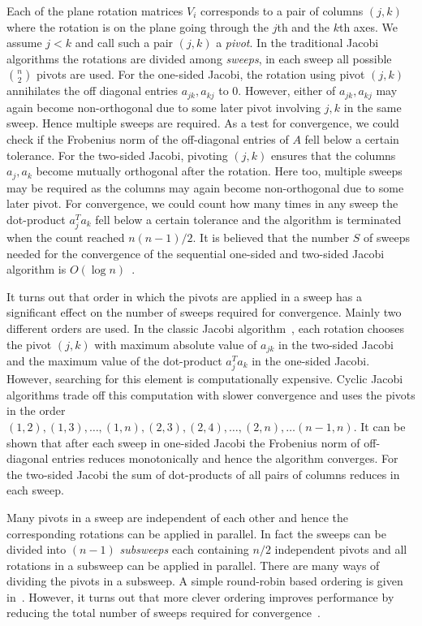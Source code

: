\documentclass[10pt, conference, compsocconf]{IEEEtran}
\begin{document}
Each of the plane rotation matrices $V_i$ corresponds to a pair of columns $(j,k)$ where the rotation is on the plane going through the $j$th and the $k$th axes. We assume $j<k$ and call such a pair $(j,k)$ a \emph{pivot}.  In the traditional Jacobi algorithms the rotations are divided among \emph{sweeps}, in each sweep all possible ${n \choose 2}$ pivots are used. For the one-sided Jacobi, the rotation using pivot $(j,k)$ annihilates the off diagonal entries $a_{jk}, a_{kj}$ to $0$. However, either of $a_{jk}, a_{kj}$ may again become non-orthogonal due to some later pivot involving $j,k$ in the same sweep. Hence multiple sweeps are required. As a test for convergence, we could check if the Frobenius norm of the off-diagonal entries of $A$ fell below a certain tolerance. For the two-sided Jacobi, pivoting $(j,k)$ ensures that the columns $a_j,a_k$ become mutually orthogonal after the rotation. Here too, multiple sweeps may be required as the columns may again become non-orthogonal due to some later pivot. For convergence, we could count how many times in any sweep the dot-product $a_j^{T}a_k$ fell below a certain tolerance and the algorithm is terminated when the count reached $n(n-1)/2$. It is believed that the number $S$ of sweeps needed for the convergence of the sequential one-sided and two-sided Jacobi algorithm is $O(\log n)$~\cite{golub2012matrix}.  

It turns out that order in which the pivots are applied in a sweep has a significant effect on the number of sweeps required for convergence. Mainly two different orders are used. In the classic Jacobi algorithm~\cite{golub2012matrix}, each rotation chooses the pivot $(j,k)$ with maximum absolute value of $a_{jk}$ in the two-sided Jacobi and the maximum value of the dot-product $a_j^{T}a_k$ in the one-sided Jacobi. However, searching for this element is computationally expensive. Cyclic Jacobi algorithms trade off this computation with slower convergence and uses the pivots in the order $(1,2), (1,3), \ldots, (1,n), (2,3), (2,4), \ldots, (2,n), \ldots (n-1,n)$.  It can be shown that after each sweep in one-sided Jacobi the Frobenius norm of off-diagonal entries reduces monotonically and hence the algorithm converges. For the two-sided Jacobi the sum of dot-products of all pairs of columns reduces in each sweep.

Many pivots in a sweep are independent of each other and hence the corresponding rotations can be applied in parallel. In fact the sweeps can be divided into $(n-1)$ \emph{subsweeps} each containing $n/2$ independent pivots and all rotations in a subsweep can be applied in parallel. There are many ways of dividing the pivots in a subsweep. A simple round-robin based ordering is given in~\cite{golub2012matrix}. However, it turns out that more clever ordering improves performance by reducing the total number of sweeps required for convergence~\cite{becka2002dynamic}.
\end{document}
